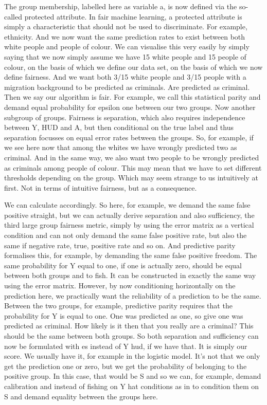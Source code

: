 The group membership, labelled here as variable a, is now defined via the so-called protected attribute. In fair machine learning, a protected attribute is simply a characteristic that should not be used to discriminate. For example, ethnicity. And we now want the same prediction rates to exist between both white people and people of colour. We can visualise this very easily by simply saying that we now simply assume we have 15 white people and 15 people of colour, on the basis of which we define our data set, on the basis of which we now define fairness. And we want both 3/15 white people and 3/15 people with a migration background to be predicted as criminals. Are predicted as criminal. Then we say our algorithm is fair. For example, we call this statistical parity and demand equal probability for epsilon one between our two groups. Now another subgroup of groups. Fairness is separation, which also requires independence between Y, HUD and A, but then conditional on the true label and thus separation focusses on equal error rates between the groups. So, for example, if we see here now that among the whites we have wrongly predicted two as criminal. And in the same way, we also want two people to be wrongly predicted as criminals among people of colour. This may mean that we have to set different thresholds depending on the group. Which may seem strange to us intuitively at first. Not in terms of intuitive fairness, but as a consequence.

We can calculate accordingly. So here, for example, we demand the same false positive straight, but we can actually derive separation and also sufficiency, the third large group fairness metric, simply by using the error matrix as a vertical condition and can not only demand the same false positive rate, but also the same if negative rate, true, positive rate and so on. And predictive parity formalises this, for example, by demanding the same false positive freedom. The same probability for Y equal to one, if one is actually zero, should be equal between both groups and to fish. It can be constructed in exactly the same way using the error matrix. However, by now conditioning horizontally on the prediction here, we practically want the reliability of a prediction to be the same. Between the two groups, for example, predictive parity requires that the probability for Y is equal to one. One was predicted as one, so give one was predicted as criminal. How likely is it then that you really are a criminal? This should be the same between both groups. So both separation and sufficiency can now be formulated with es instead of Y hud, if we have that. It is simply our score. We usually have it, for example in the logistic model. It's not that we only get the prediction one or zero, but we get the probability of belonging to the positive group. In this case, that would be S and so we can, for example, demand calibration and instead of fishing on Y hat conditions as in to condition them on S and demand equality between the groups here.

